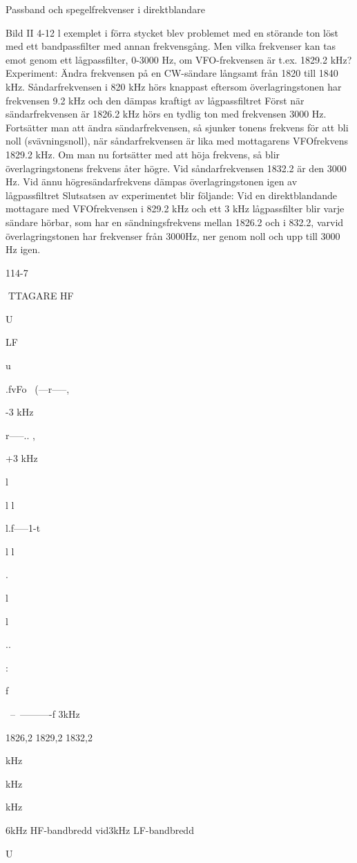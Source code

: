 \documentclass[a4paper,twoside,twocolumn,openright]{book}
\begin{document}
{{{Passband och spegelfrekvenser i direktblandare

Bild II 4-12
l exemplet i förra stycket blev problemet
med en störande ton löst med ett bandpassfilter med annan frekvensgång.
Men vilka frekvenser kan tas emot genom
ett lågpassfilter, 0-3000 Hz, om VFO-frekvensen är t.ex. 1829.2 kHz?
Experiment:
Ändra frekvensen på en CW-sändare långsamt från 1820 till 1840 kHz.
Såndarfrekvensen i 820 kHz hörs knappast eftersom överlagringstonen har frekvensen 9.2 kHz och den dämpas kraftigt av
lågpassfiltret Först när sändarfrekvensen
är 1826.2 kHz hörs en tydlig ton med frekvensen 3000 Hz. Fortsätter man att ändra
sändarfrekvensen, så sjunker tonens frekvens för att bli noll (svävningsnoll), när såndarfrekvensen är lika med mottagarens VFOfrekvens 1829.2 kHz. Om man nu fortsätter
med att höja frekvens, så blir överlagringstonens frekvens åter högre. Vid såndarfrekvensen 1832.2 är den 3000 Hz. Vid ännu
högresändarfrekvens dämpas överlagringstonen igen av lågpassfiltret
Slutsatsen av experimentet blir följande:
Vid en direktblandande mottagare med VFOfrekvensen i 829.2 kHz och ett 3 kHz lågpassfilter blir varje sändare hörbar, som har
en sändningsfrekvens mellan 1826.2 och
i 832.2, varvid överlagringstonen har frekvenser från 3000Hz, ner genom noll och upp
till 3000 Hz igen.

114-7

TTAGARE
HF

U

LF

u

.fvFo~
(---r-----,

-3 kHz

r-----.. ,

+3 kHz

l

l
l

l.f-----1-t

l
l

.

l

l

..

:

f

~--~----------f
3kHz

1826,2 1829,2 1832,2

kHz

kHz

kHz

6kHz HF-bandbredd vid3kHz LF-bandbredd

U

}}}
\end{document}
